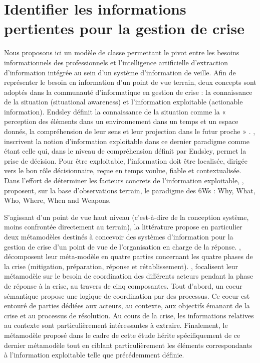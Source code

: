 \section*{Identifier les informations pertientes pour la gestion de crise}

Nous proposons ici un modèle de classe permettant le pivot entre les besoins
informationnels des professionnels et l'intelligence artificielle d'extraction
d'information intégrée au sein d'un système d'information de veille.
Afin de représenter le besoin en information d'un point de vue terrain, deux concepts sont adoptés dans la communauté d'informatique en gestion de crise : la connaissance de la situation (situational awareness) et l'information exploitable (actionable information).
Endsley définit la connaissance de la situation comme la « perception des éléments dans un environnement dans un temps et un
espace donnés, la compréhension de leur sens et leur projection dans le futur
proche » \parencite{endsleyTheorySituationAwareness1995}.
\textcite{cocheSocialMediaProcessing2021}, inscrivent la notion d'information exploitable dans ce dernier paradigme comme étant celle qui, dans le niveau de compréhension définit par Endsley, permet la prise de décision.
Pour être exploitable, l'information doit être localisée, dirigée vers le bon rôle décisionnaire, reçue en temps voulue, fiable et contextualisée.
Dans l'effort de déterminer les facteurs concrets de l'information exploitable, \textcite{kropczynskiIdentifyingActionableInformation2018}, proposent, sur la base d'observations terrain, le paradigme des 6Ws : Why, What, Who, Where, When and Weapons.


S'agissant d'un point de vue haut niveau (c'est-à-dire de la conception système, moins confrontée directement au terrain), la littérature propose en particulier deux métamodèles destinés à concevoir des systèmes d'information pour la gestion de crise d'un point de vue de l'organisation en charge de la réponse.
\textcite{othmanDevelopmentValidationDisaster2014}, décomposent leur méta-modèle en quatre parties concernant les quatre phases de la crise (mitigation, préparation, réponse et rétablissement).
\textcite{benabenAIFrameworkMetamodel2020}, focalisent leur métamodèle sur le besoin de coordination des différents acteurs pendant la phase de réponse à la crise, au travers de cinq composantes.
Tout d'abord, un coeur sémantique propose une logique de coordination par des processus. Ce coeur est entouré de parties dédiées aux acteurs, au contexte, aux objectifs émanant de la crise et au processus de résolution.
Au cours de la crise, les informations relatives au contexte sont particulièrement intéressantes à extraire.
Finalement, le métamodèle proposé dans le cadre de cette étude hérite spécifiquement de ce dernier métamodèle tout en ciblant particulièrement les éléments correspondants à l'information exploitable telle que précédemment définie.


